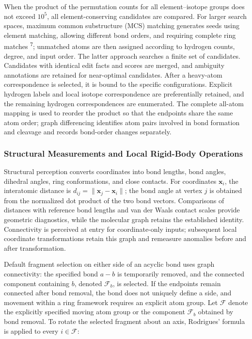 When the product of the permutation counts for all element–isotope groups does not exceed $10^5$, all element-conserving candidates are compared. For larger search spaces, maximum common substructure (MCS) matching generates seeds using element matching, allowing different bond orders, and requiring complete ring matches \textsuperscript{7}; unmatched atoms are then assigned according to hydrogen counts, degree, and input order. The latter approach searches a finite set of candidates. Candidates with identical edit facts and scores are merged, and ambiguity annotations are retained for near-optimal candidates. After a heavy-atom correspondence is selected, it is bound to the specific configurations. Explicit hydrogen labels and local isotope correspondence are preferentially retained, and the remaining hydrogen correspondences are enumerated. The complete all-atom mapping is used to reorder the product so that the endpoints share the same atom order; graph differencing identifies atom pairs involved in bond formation and cleavage and records bond-order changes separately.

\subsubsection{Structural Measurements and Local Rigid-Body Operations}

Structural perception converts coordinates into bond lengths, bond angles, dihedral angles, ring conformations, and close contacts. For coordinates $\mathbf x_i$, the interatomic distance is $d_{ij}=\|\mathbf x_j-\mathbf x_i\|$; the bond angle at vertex $j$ is obtained from the normalized dot product of the two bond vectors. Comparisons of distances with reference bond lengths and van der Waals contact scales provide geometric diagnostics, while the molecular graph retains the established identity. Connectivity is perceived at entry for coordinate-only inputs; subsequent local coordinate transformations retain this graph and remeasure anomalies before and after transformation.

Default fragment selection on either side of an acyclic bond uses graph connectivity: the specified bond $a-b$ is temporarily removed, and the connected component containing $b$, denoted $\mathcal F_b$, is selected. If the endpoints remain connected after bond removal, the bond does not uniquely define a side, and movement within a ring framework requires an explicit atom group. Let $\mathcal F$ denote the explicitly specified moving atom group or the component $\mathcal F_b$ obtained by bond removal. To rotate the selected fragment about an axis, Rodrigues' formula is applied to every $i\in\mathcal F$:

